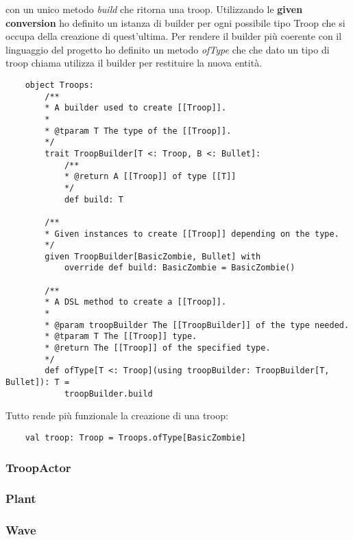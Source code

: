 con un unico metodo \textit{build} che ritorna una troop.
Utilizzando le \textbf{given conversion} ho definito un istanza di builder per ogni possibile tipo Troop che si occupa
della creazione di quest'ultima.
Per rendere il builder più coerente con il linguaggio del progetto ho definito un metodo \textit{ofType} che che dato un tipo
di troop chiama utilizza il builder per restituire la nuova entità.
\begin{verbatim}
    object Troops:
        /**
        * A builder used to create [[Troop]].
        *
        * @tparam T The type of the [[Troop]].
        */
        trait TroopBuilder[T <: Troop, B <: Bullet]:
            /**
            * @return A [[Troop]] of type [[T]]
            */
            def build: T

        /**
        * Given instances to create [[Troop]] depending on the type.
        */
        given TroopBuilder[BasicZombie, Bullet] with
            override def build: BasicZombie = BasicZombie()

        /**
        * A DSL method to create a [[Troop]].
        *
        * @param troopBuilder The [[TroopBuilder]] of the type needed.
        * @tparam T The [[Troop]] type.
        * @return The [[Troop]] of the specified type.
        */
        def ofType[T <: Troop](using troopBuilder: TroopBuilder[T, Bullet]): T =
            troopBuilder.build
\end{verbatim}

Tutto rende più funzionale la creazione di una troop:
\begin{verbatim}
    val troop: Troop = Troops.ofType[BasicZombie]
\end{verbatim}

\subsubsection{TroopActor}

\subsubsection{Plant}

\subsubsection{Wave}